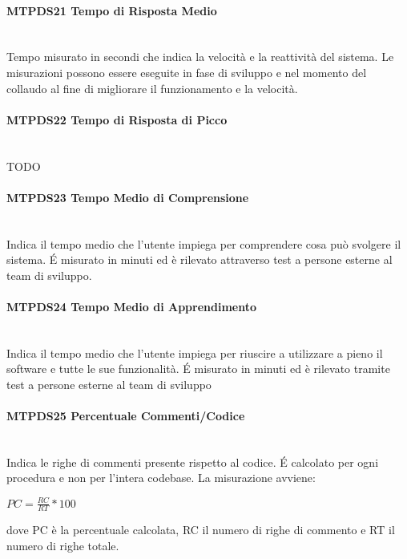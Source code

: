 \paragraph{MTPDS21 Tempo di Risposta Medio}\-\\
Tempo misurato in secondi che indica la velocità e la reattività del sistema. Le misurazioni possono essere eseguite in fase di sviluppo e nel momento del collaudo al fine di migliorare il funzionamento e la velocità.

\paragraph{MTPDS22 Tempo di Risposta di Picco}\-\\
TODO

\paragraph{MTPDS23 Tempo Medio di Comprensione}\-\\
Indica il tempo medio che l'utente impiega per comprendere cosa può svolgere il sistema. \'E misurato in minuti ed è rilevato attraverso test a persone esterne al team di sviluppo.

\paragraph{MTPDS24 Tempo Medio di Apprendimento}\-\\
Indica il tempo medio che l'utente impiega per riuscire a utilizzare a pieno il software e tutte le sue funzionalità. \'E misurato in minuti ed è rilevato tramite test a persone esterne al team di sviluppo 

\paragraph{MTPDS25 Percentuale Commenti/Codice}\-\\
Indica le righe di commenti presente rispetto al codice. \'E calcolato per ogni procedura e non per l'intera codebase. La misurazione avviene:
\begin{center}
	\item $PC = \frac{RC}{RT}*100$
\end{center}
dove PC è la percentuale calcolata, RC il numero di righe di commento e RT il numero di righe totale.


